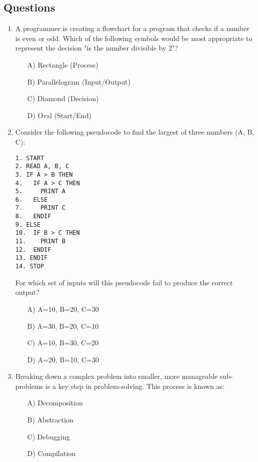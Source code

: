 \documentclass[9pt]{article}
\begin{document}
\newpage

\begin{multicols}{2}

\section*{Questions}

\begin{enumerate}
\item A programmer is creating a flowchart for a program that checks if a number is even or odd. Which of the following symbols would be most appropriate to represent the decision "is the number divisible by 2"?
\begin{enumerate}
\item[A)] Rectangle (Process)
\item[B)] Parallelogram (Input/Output)
\item[C)] Diamond (Decision)
\item[D)] Oval (Start/End)
\end{enumerate}

\item Consider the following pseudocode to find the largest of three numbers (A, B, C):
\begin{verbatim}
1. START
2. READ A, B, C
3. IF A > B THEN
4.   IF A > C THEN
5.     PRINT A
6.   ELSE
7.     PRINT C
8.   ENDIF
9. ELSE
10.  IF B > C THEN
11.    PRINT B
12.  ENDIF
13. ENDIF
14. STOP
\end{verbatim}
For which set of inputs will this pseudocode fail to produce the correct output?
\begin{enumerate}
    \item[A)] A=10, B=20, C=30
    \item[B)] A=30, B=20, C=10
    \item[C)] A=10, B=30, C=20
    \item[D)] A=20, B=10, C=30
\end{enumerate}

\item Breaking down a complex problem into smaller, more manageable sub-problems is a key step in problem-solving. This process is known as:
\begin{enumerate}
    \item[A)] Decomposition
    \item[B)] Abstraction
    \item[C)] Debugging
    \item[D)] Compilation
\end{enumerate}


\end{enumerate}
\end{multicols}
\end{document}
